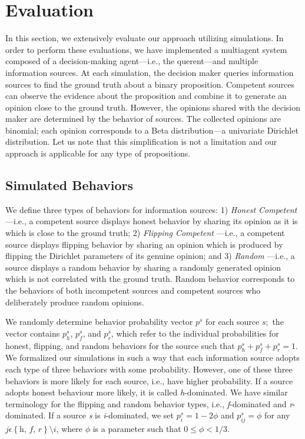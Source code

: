 \documentclass[a4,12pt]{ozu-thesis}
\begin{document}
\section{Evaluation}
In this section, we extensively evaluate our approach utilizing simulations. In order to perform these evaluations,
we have implemented a multiagent system composed of a decision-making agent—i.e., the querent—and multiple information sources. At each simulation, the decision maker queries information sources to find the ground truth about a binary proposition. Competent sources can observe the evidence about the proposition and combine it to generate an opinion close to the ground truth. However, the opinions shared with the decision maker are determined by the behavior of sources. The collected opinions are binomial; each opinion corresponds to a Beta distribution—a univariate Dirichlet distribution. Let us note that this simplification is not a limitation and our approach is applicable for any type of propositions.

\subsection{Simulated Behaviors}
We define three types of behaviors for information sources: 1) \textit{Honest Competent} —i.e., a competent source displays honest behavior by sharing its opinion as it is which is close to the ground truth; 2) \textit{Flipping Competent} —i.e., a competent source displays flipping behavior by sharing an opinion which is produced by flipping the Dirichlet parameters of its genuine opinion; and 3) \textit{Random} —i.e., a source displays a random behavior by sharing a randomly generated opinion which is not correlated with the ground truth. Random behavior corresponds to the behaviors of both incompetent sources and competent sources who deliberately produce random opinions.

We randomly determine behavior probability vector $p^{s}$ for each source $\textit{s};$ the vector contains $p_{h}^{s}$, $p_{f}^{s}$, and $p_{r}^{s}$, which refer to the individual probabilities for honest, flipping, and random behaviors for the source such that $ p_{h}^{s} + p_{f}^{s} + p_{r}^{s} = 1.$ We formalized our simulations in such a way that each information source adopts each type of three behaviors with some probability. However, one of these three behaviors is more likely for each source, i.e., have higher probability. If a source adopts honest behaviour more likely, it is called \textit{h}-dominated. We have similar terminology for the flipping and random behavior types, i.e., \textit{f}-dominated and \textit{r}-dominated. If a source \textit{s} is \textit{i}-dominated, we set $p_{i}^{s} = 1 - 2\phi $ and $p_{ij}^{s} = \phi $ for any $j \epsilon \left \{ \textit{h, f, r} \right \} \setminus  i$, where $\phi$ is a parameter such that $0 \leq \phi < 1 /3.$
\end{document}
